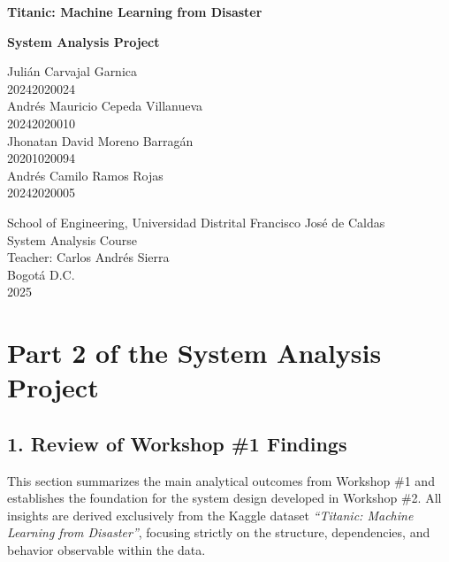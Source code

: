 \documentclass[12pt]{report}
\begin{document}
\begin{titlepage}
    \centering
    
    {\Large \textbf{Titanic: Machine Learning from Disaster} \par}
    \vspace{0.5cm}
    {\large \textbf{System Analysis Project} \par}
    \vspace{3cm}
    
    {\large 
    Julián Carvajal Garnica \\ 
    20242020024 \\[0.5cm]
    Andrés Mauricio Cepeda Villanueva \\
    20242020010 \\[0.5cm]
    Jhonatan David Moreno Barragán \\
    20201020094 \\[0.5cm]
    Andrés Camilo Ramos Rojas \\
    20242020005
    }
    
    \vfill
    
    School of Engineering, Universidad Distrital Francisco José de Caldas \\
    System Analysis Course \\
    Teacher: Carlos Andrés Sierra \\
    Bogotá D.C. \\
    2025
    
\end{titlepage}
\chapter*{Part 2 of the System Analysis Project}

\section*{1. Review of Workshop \#1 Findings}

This section summarizes the main analytical outcomes from Workshop \#1 and establishes
the foundation for the system design developed in Workshop \#2. All insights are derived
exclusively from the Kaggle dataset \textit{“Titanic: Machine Learning from Disaster”},
focusing strictly on the structure, dependencies, and behavior observable within the data.
\end{document}
